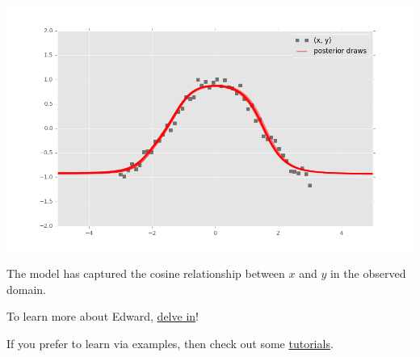 \includegraphics[width=700px]{images/getting-started-fig1.png}

The model has captured the cosine relationship between $x$ and $y$
in the observed domain.

To learn more about Edward, \href{/api}{delve in}!

If you prefer to learn via examples, then check out some
\href{/tutorials/}{tutorials}.
